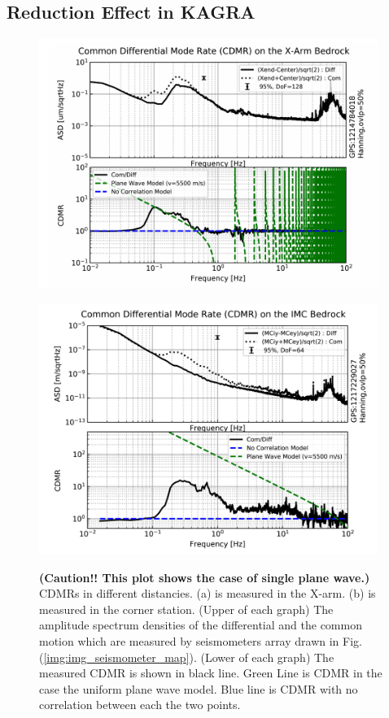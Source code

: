 \documentclass[a4paper,12pt]{book}
\begin{document}
\subsection{Reduction Effect in KAGRA}

\begin{figure}[H]
  \begin{center}  
    \begin{minipage}{0.5\vsize}
      \includegraphics[width=11.0cm]{./img_cdmr_xarm.png}    
      \label{img:img_cdmr_xarm}
    \end{minipage}
  \end{center}
  \begin{center}  
    \begin{minipage}{0.5\vsize}
      \includegraphics[width=11.0cm]{./img_cdmr_imc.png}
      \label{img:img_cdmr_imc}  
    \end{minipage}
  \end{center}      
  \caption{\textbf{(Caution!! This plot shows the case of single plane wave.)} CDMRs in different distancies. (a) is measured in the X-arm. (b) is measured in the corner station. (Upper of each graph) The amplitude spectrum densities of the differential and the common motion which are measured by seismometers array drawn in Fig.(\ref{img:img_seismometer_map}). (Lower of each graph) The measured CDMR is shown in black line. Green Line is CDMR in the case the uniform plane wave model. Blue line is CDMR with no correlation between each the two points.}
\end{figure}
\end{document}
